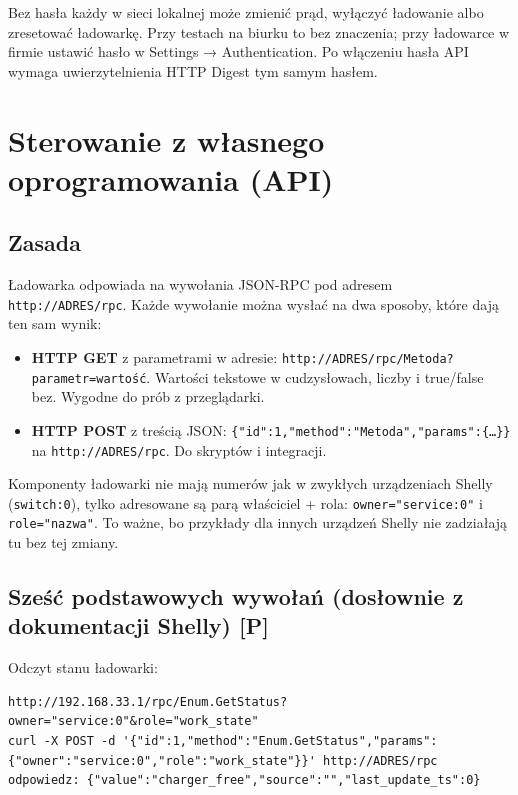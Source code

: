 \documentclass[11pt,a4paper]{article}
\newcommand{\tagP}{\textcolor{apgreen}{\textbf{[P]}}}
\newcommand{\code}[1]{\texttt{#1}}
\begin{document}
\begin{uwaga}
Bez hasła każdy w sieci lokalnej może zmienić prąd, wyłączyć ładowanie albo zresetować ładowarkę. Przy testach na biurku to bez znaczenia; przy ładowarce w firmie ustawić hasło w Settings → Authentication. Po włączeniu hasła API wymaga uwierzytelnienia HTTP Digest tym samym hasłem.
\end{uwaga}

\section{Sterowanie z własnego oprogramowania (API)}
\label{sec:api}

\subsection{Zasada}

Ładowarka odpowiada na wywołania JSON-RPC pod adresem \code{http://ADRES/rpc}. Każde wywołanie można wysłać na dwa sposoby, które dają ten sam wynik:

\begin{itemize}
\item \textbf{HTTP GET} z parametrami w adresie: \code{http://ADRES/rpc/Metoda?parametr=wartość}. Wartości tekstowe w cudzysłowach, liczby i true/false bez. Wygodne do prób z przeglądarki.
\item \textbf{HTTP POST} z treścią JSON: \code{\{"id":1,"method":"Metoda","params":\{…\}\}} na \code{http://ADRES/rpc}. Do skryptów i integracji.
\end{itemize}

Komponenty ładowarki nie mają numerów jak w zwykłych urządzeniach Shelly (\code{switch:0}), tylko adresowane są parą właściciel + rola: \code{owner="service:0"} i \code{role="nazwa"}. To ważne, bo przykłady dla innych urządzeń Shelly nie zadziałają tu bez tej zmiany.

\subsection{Sześć podstawowych wywołań (dosłownie z dokumentacji Shelly) \tagP}

Odczyt stanu ładowarki:
\begin{lstlisting}
http://192.168.33.1/rpc/Enum.GetStatus?owner="service:0"&role="work_state"
curl -X POST -d '{"id":1,"method":"Enum.GetStatus","params":{"owner":"service:0","role":"work_state"}}' http://ADRES/rpc
odpowiedz: {"value":"charger_free","source":"","last_update_ts":0}
\end{lstlisting}
\end{document}
